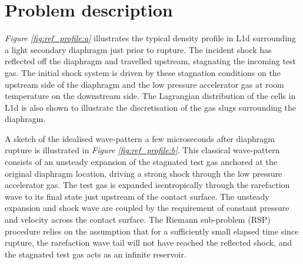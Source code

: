 \documentclass[a4paper,10pt]{article}
\begin{document}
\section{Problem description}

\emph{Figure \ref{fig:ref_profile:a}} illustrates the typical density profile in L1d surrounding a light secondary diaphragm just prior to rupture.  The incident shock has reflected off the diaphragm and travelled upstream, stagnating the incoming test gas.  The initial shock system is driven by these stagnation conditions on the upstream side of the diaphragm and the low pressure accelerator gas at room temperature on the downstream side.  The Lagrangian distribution of the cells in L1d is also shown to illustrate the discretisation of the gas slugs surrounding the diaphragm.

\par \medskip

A sketch of the idealised wave-pattern a few microseconds after diaphragm rupture is illustrated in \emph{Figure \ref{fig:ref_profile:b}}.  This classical wave-pattern consists of an unsteady expansion of the stagnated test gas anchored at the original diaphragm location, driving a strong shock through the low pressure accelerator gas.  The test gas is expanded isentropically through the rarefaction wave to its final state just upstream of the contact surface. The unsteady expansion and shock wave are coupled by the requirement of constant pressure and velocity across the contact surface.  The Riemann sub-problem  (RSP) procedure relies on the assumption that for a sufficiently small elapsed time since rupture, the rarefaction wave tail will not have reached the reflected shock, and the stagnated test gas acts as an infinite reservoir.
\end{document}
